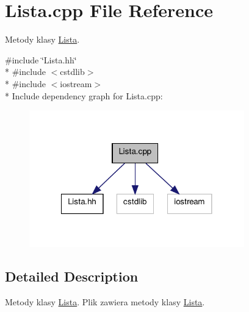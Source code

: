 \hypertarget{a00009}{\section{Lista.\-cpp File Reference}
\label{a00009}
}


Metody klasy \hyperlink{a00003}{Lista}.  


{\ttfamily \#include \char`\"{}Lista.\-hh\char`\"{}}\\*
{\ttfamily \#include $<$cstdlib$>$}\\*
{\ttfamily \#include $<$iostream$>$}\\*
Include dependency graph for Lista.\-cpp\-:\nopagebreak
\begin{figure}[H]
\begin{center}
\leavevmode
\includegraphics[width=264pt]{a00020}
\end{center}
\end{figure}


\subsection{Detailed Description}
Metody klasy \hyperlink{a00003}{Lista}. Plik zawiera metody klasy \hyperlink{a00003}{Lista}. 